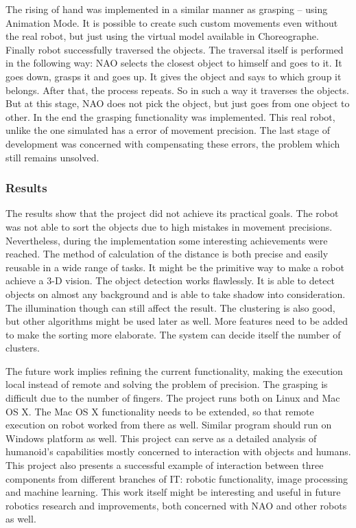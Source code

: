         The rising of hand was implemented in a similar manner as grasping -- using Animation Mode. It is possible to create such custom movements even without the real robot, but just using the virtual model available in Choreographe. Finally robot successfully traversed the objects. The traversal itself is performed in the following way: NAO selects the closest object to himself and goes to it. It goes down, grasps it and goes up. It gives the object and says to which group it belongs. After that, the process repeats. So in such a way it traverses the objects. But at this stage, NAO does not pick the object, but just goes from one object to other. In the end the grasping functionality was implemented.  This real robot, unlike the one simulated has a error of movement precision. The last stage of development was concerned with compensating these errors, the problem which still remains unsolved. 


    \subsubsection{Results}

        The results show that the project did not achieve its practical goals. The robot was not able to sort the objects due to high mistakes in movement precisions. Nevertheless, during the implementation some interesting achievements were reached. The method of calculation of the distance is both precise and easily reusable in a wide range of tasks. It might be the primitive way to make a robot achieve a 3-D vision. The object detection works flawlessly. It is able to detect objects on almost any background and is able to take shadow into consideration. The illumination though can still affect the result. The clustering is also good, but other algorithms might be used later as well. More features need to be added to make the sorting more elaborate. The system can decide itself the number of clusters. 

        The future work implies refining the current functionality, making the execution local instead of remote and solving the problem of precision. The grasping is difficult due to the number of fingers. The project runs both on Linux and Mac OS X. The Mac OS X functionality needs to be extended, so that remote execution on robot worked from there as well. Similar program should run on Windows platform as well. This project can serve as a detailed analysis of humanoid's capabilities mostly concerned to interaction with objects and humans. This project also presents a successful example of interaction between three components from different branches of IT: robotic functionality, image processing and machine learning. This work itself might be interesting and useful in future robotics research and improvements, both concerned with NAO and other robots as well. 






\clearpage